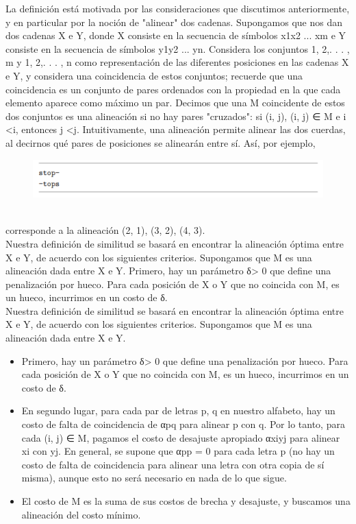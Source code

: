 \documentclass[a4paper]{article}
\begin{document}
La definición está motivada por las consideraciones que discutimos anteriormente, y en particular por la noción de "alinear" dos cadenas. Supongamos que nos dan dos cadenas X e Y, donde X consiste en la secuencia de símbolos x1x2 ... xm e Y consiste en la secuencia de símbolos y1y2 ... yn. Considera los conjuntos {1, 2,. . . , m} y {1, 2,. . . , n} como representación de las diferentes posiciones en las cadenas X e Y, y considera una coincidencia de estos conjuntos; recuerde que una coincidencia es un conjunto de pares ordenados con la propiedad en la que cada elemento aparece como máximo un par. Decimos que una M coincidente de estos dos conjuntos es una alineación si no hay pares "cruzados": si (i, j), (i, j) ∈ M e i <i, entonces j <j. Intuitivamente, una alineación permite alinear las dos cuerdas, al decirnos qué pares de posiciones se alinearán entre sí. Así, por ejemplo, \\

\begin{figure}[h]
\centering
\includegraphics[scale=1]{Imagenes-Seccion6/cod6_12.PNG}
\end{figure}\\

corresponde a la alineación {(2, 1), (3, 2), (4, 3)}.\\

Nuestra definición de similitud se basará en encontrar la alineación óptima entre X e Y, de acuerdo con los siguientes criterios. Supongamos que M es una alineación dada entre X e Y. Primero, hay un parámetro δ> 0 que define una penalización por hueco. Para cada posición de X o Y que no coincida con M, es un hueco, incurrimos en un costo de δ.\\

Nuestra definición de similitud se basará en encontrar la alineación óptima entre X e Y, de acuerdo con los siguientes criterios. Supongamos que M es una alineación dada entre X e Y.\\

\begin{itemize}
    \item Primero, hay un parámetro δ> 0 que define una penalización por hueco. Para cada posición de X o Y que no coincida con M, es un hueco, incurrimos en un costo de δ.

\item En segundo lugar, para cada par de letras p, q en nuestro alfabeto, hay un costo de falta de coincidencia de αpq para alinear p con q. Por lo tanto, para cada (i, j) ∈ M, pagamos el costo de desajuste apropiado αxiyj para alinear xi con yj. En general, se supone que αpp = 0 para cada letra p (no hay un costo de falta de coincidencia para alinear una letra con otra copia de sí misma), aunque esto no será necesario en nada de lo que sigue.

\item El costo de M es la suma de sus costos de brecha y desajuste, y buscamos una alineación del costo mínimo.
\end{itemize}
\end{document}
